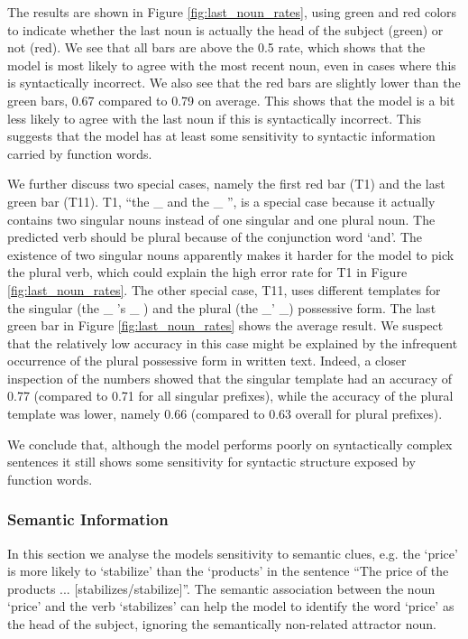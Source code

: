 The results are shown in Figure \ref{fig:last_noun_rates},
using green and red colors to indicate whether
the last noun is actually the head of the subject (green)
or not (red). 
%
We see that all bars are above the 0.5 rate,
which shows that the model is most
likely to agree with the most recent noun,
even in cases where this is syntactically incorrect. 
%
We also see that the red bars are slightly
lower than the green bars,
0.67 compared to 0.79 on average.
This shows that the model is a bit less likely
to agree with the last noun if this is
syntactically incorrect.
This suggests that the model has 
at least some sensitivity
to syntactic information carried by function words.
%

%
We further discuss two special cases,
namely the first red bar (T1) and 
the last green bar (T11).
T1, ``the \_ and the \_ '', is a special case because it 
actually contains two singular nouns
instead of one singular and one plural noun. 
The predicted verb should be plural because of the
conjunction word `and'.
The existence of two singular nouns 
apparently makes it harder for the model
to pick the plural verb,
which could explain the high error rate
for T1 in Figure \ref{fig:last_noun_rates}.
%
The other special case, T11, uses different templates for the singular 
(the \_ 's \_ ) and the plural (the \_' \_) possessive form.
The last green bar in Figure \ref{fig:last_noun_rates} shows the average result.
We suspect that the relatively low accuracy
in this case might be explained by the infrequent
occurrence of the plural possessive form in written text.
Indeed, a closer inspection of the numbers showed that
the singular template had an accuracy
of 0.77 (compared to 0.71 for all singular prefixes), 
while the accuracy of the plural template
was lower, namely 0.66 (compared to 0.63 overall for plural prefixes).
%

We conclude that, although the model 
performs poorly on syntactically complex sentences it
still shows some sensitivity for syntactic 
structure exposed by function words. 


\subsubsection{Semantic Information}

In this section we analyse the models sensitivity
to semantic clues, e.g. the `price' is more likely
to `stabilize' than the `products' in the sentence
``The price of the products ... [stabilizes/stabilize]''.
The semantic association between the noun `price' and the
verb `stabilizes' can help the model to identify
the word `price' as the head of the subject,
ignoring the semantically non-related attractor noun.
  
